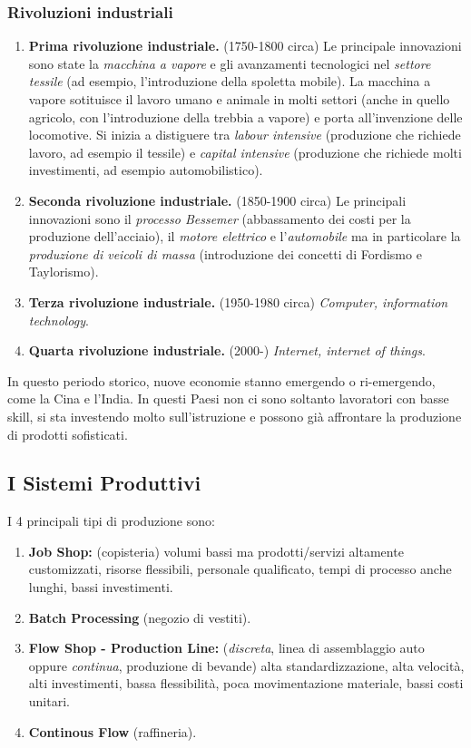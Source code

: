 \documentclass[a4paper,portrait,12pt]{article}
\theoremstyle{definition}
\begin{document}
\subsubsection{Rivoluzioni industriali}
\begin{enumerate}
\item \textbf{Prima rivoluzione industriale.} (1750-1800 circa) Le principale innovazioni sono state la \emph{macchina a vapore} e gli avanzamenti tecnologici nel \emph{settore tessile} (ad esempio, l'introduzione della spoletta mobile).
La macchina a vapore sotituisce il lavoro umano e animale in molti settori (anche in quello agricolo, con l'introduzione della trebbia a vapore) e porta all'invenzione delle locomotive.
Si inizia a distiguere tra \emph{labour intensive} (produzione che richiede lavoro, ad esempio il tessile) e \emph{capital intensive} (produzione che richiede molti investimenti, ad esempio automobilistico).
\item \textbf{Seconda rivoluzione industriale.} (1850-1900 circa) Le principali innovazioni sono il \emph{processo Bessemer} (abbassamento dei costi per la produzione dell'acciaio), il \emph{motore elettrico} e l'\emph{automobile} ma in particolare la \emph{produzione di veicoli di massa} (introduzione dei concetti di Fordismo e Taylorismo).
\item \textbf{Terza rivoluzione industriale.} (1950-1980 circa) \emph{Computer, information technology}.
\item \textbf{Quarta rivoluzione industriale.} (2000-) \emph{Internet, internet of things}.
\end{enumerate}

In questo periodo storico, nuove economie stanno emergendo o ri-emergendo, come la Cina e l'India.
In questi Paesi non ci sono soltanto lavoratori con basse skill, si sta investendo molto sull'istruzione e possono già affrontare la produzione di prodotti sofisticati.


\subsection{I Sistemi Produttivi}

I 4 principali tipi di produzione sono:
\begin{enumerate}
\item \textbf{Job Shop:} (copisteria) volumi bassi ma prodotti/servizi altamente customizzati, risorse flessibili, personale qualificato, tempi di processo anche lunghi, bassi investimenti.
\item \textbf{Batch Processing} (negozio di vestiti).
\item \textbf{Flow Shop - Production Line:} (\emph{discreta}, linea di assemblaggio auto oppure \emph{continua}, produzione di bevande) alta standardizzazione, alta velocità, alti investimenti, bassa flessibilità, poca movimentazione materiale, bassi costi unitari.
\item \textbf{Continous Flow} (raffineria).
\end{enumerate}
\end{document}
